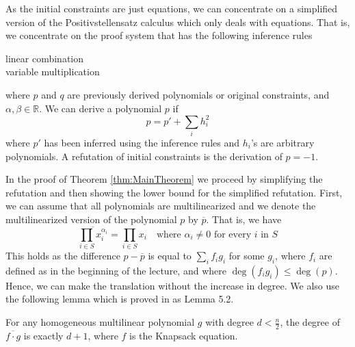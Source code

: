 \documentclass[a4paper,twoside,justified]{tufte-handout}
\begin{document}
As the initial constraints are just equations, we can concentrate on a
simplified version of the Positivstellensatz calculus which only deals
with equations. That is, we concentrate on the proof system that has
the following inference rules
\begin{description}
\item[linear combination]   
  \begin{prooftree}
  \end{prooftree}
\item[variable multiplication] 
  \begin{prooftree}
  \end{prooftree}
\end{description}
where $p$ and $q$ are previously derived polynomials or original
constraints, and $\alpha, \beta \in \mathbb{R}$. We can derive a
polynomial $p$ if
\begin{equation}
  p = p' + \sum_i h_i^2
\end{equation}
where $p'$ has been inferred using the inference rules and $h_i$'s are
arbitrary polynomials. A refutation of initial constraints is the
derivation of $p = -1$.

In the proof of Theorem \ref{thm:MainTheorem} we proceed by
simplifying the refutation and then showing the lower bound for the
simplified refutation. First, we can assume that all polynomials are
multilinearized and we denote the multilinearized version of the
polynomial $p$ by $\overline{p}$. That is, we have
\begin{equation}
  \overline{\prod_{i \in S} x_i^{\alpha_i}} = \prod_{i \in S} x_i \quad \text{where } \alpha_i \neq 0 \text{ for every $i$ in $S$}
\end{equation}
This holds as the difference $p - \overline{p}$ is equal to $\sum_i
f_i g_i$ for some $g_i$, where $f_i$ are defined as in the beginning
of the lecture, and where $\deg(f_i g_i) \leq \deg(p)$. Hence, we can
make the translation without the increase in degree. We also use the
following lemma which is proved in \cite{IPS99LowerBounds} as Lemma
5.2.

\begin{lemma}
  For any homogeneous multilinear polynomial $g$ with degree $d <
  \frac{n}{2}$, the degree of $\overline{f \cdot g}$ is exactly $d +
  1$, where $f$ is the Knapsack equation.
\end{lemma}
\end{document}
